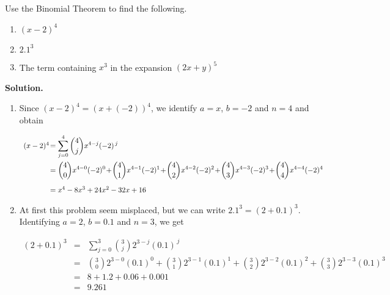 \documentclass{ximera}
\begin{document}
\begin{ex} \label{binomialthmex}  Use the Binomial Theorem to find the following.

\begin{enumerate}

\item  $(x-2)^4$

\item  $2.1^{3}$


\item  The term containing $x^3$ in the expansion $(2x+y)^{5}$

\end{enumerate}

{\bf Solution.}
\begin{enumerate}
\item  Since $(x-2)^4 = (x+(-2))^4$, we identify $a = x$, $b = -2$ and $n=4$ and obtain

\[ \begin{array}{rcl}

(x-2)^4\! &\hspace{-.1in} =  & \hspace{-.1in}\displaystyle{\sum_{j=0}^{4} \binom{4}{j} x^{4-j} (-2)^{\, j}} \\ [15pt]
        & \hspace{-.1in} =  & \hspace{-.1in}\displaystyle{\binom{4}{0} x^{4-0} (-2)^{0} \!+\! \binom{4}{1} x^{4-1} (-2)^{1} \!+\! \binom{4}{2} x^{4-2} (-2)^{2} \!+\! \binom{4}{3} x^{4-3} (-2)^{3} \!+\! \binom{4}{4} x^{4-4} (-2)^{4}} \\ [15pt]
        &\hspace{-.1in}  =  & \hspace{-.1in}x^4 -8x^3 + 24x^2 - 32x + 16 \\
\end{array} \]

\item  At first this problem seem misplaced, but we can write $2.1^{3} = (2 + 0.1)^3$.  Identifying $a =2$, $b = 0.1$ and $n=3$, we get

\[ \begin{array}{rcl}

(2+0.1)^3 & = & \displaystyle{\sum_{j=0}^{3} \binom{3}{j} 2^{3-j} (0.1) ^{\, j}} \\ [15pt]
        & = & \displaystyle{\binom{3}{0} 2^{3-0}(0.1)^{0} + \binom{3}{1} 2^{3-1} (0.1)^{1} + \binom{3}{2} 2^{3-2}(0.1)^{2} + \binom{3}{3} 2^{3-3}(0.1)^{3}} \\ [15pt]
        & = & 8 + 1.2 + 0.06 + 0.001 \\
        & = & 9.261 \\
\end{array} \]


\end{enumerate}
\end{ex}
\end{document}
